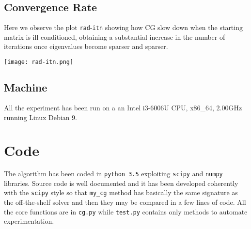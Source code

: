 \documentclass[12pt]{article}
\newcommand{\1}{\mathbbm{1}}
\begin{document}
\subsection{Convergence Rate}
Here we observe the plot \texttt{rad}-\texttt{itn} showing how CG slow down when the starting matrix is ill conditioned, obtaining a substantial increase in the number of iterations once eigenvalues become sparser and sparser. 

\begin{center}
\texttt{[image: rad-itn.png]}
\end{center}

\subsection{Machine}
All the experiment has been run on a an Intel i3-6006U CPU, x86\_64, 2.00GHz running Linux Debian 9.

\section{Code}
The algorithm has been coded in \texttt{python 3.5} exploiting \texttt{scipy} and \texttt{numpy} libraries. Source code is well documented and it has been developed coherently with the \texttt{scipy} style so that \texttt{my\_cg} method has basically the same signature as the off-the-shelf solver and then they may be compared in a few lines of code. All the core functions are in \texttt{cg.py} while \texttt{test.py} contains only methods to automate experimentation.
  
  

\end{document}
